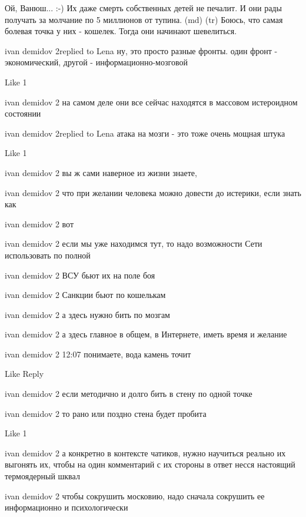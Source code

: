  
 
 
 
 

Ой, Ванюш... :-) Их даже смерть собственных детей не печалит. И они рады получать за молчание по 5 миллионов от тупина. (md) (tr) Боюсь, что самая болевая точка у них - кошелек. Тогда они начинают шевелиться.

ivan demidov 2replied to Lena
ну, это просто разные фронты. один фронт - экономический, другой - информационно-мозговой

    Like 1

ivan demidov 2
на самом деле они все сейчас находятся в массовом истероидном состоянии

ivan demidov 2replied to Lena
атака на мозги - это тоже очень мощная штука

    Like 1

ivan demidov 2
вы ж сами наверное из жизни знаете,

ivan demidov 2
что при желании человека можно довести до истерики, если знать как

ivan demidov 2
вот

ivan demidov 2
если мы уже находимся тут, то надо возможности Сети использовать по полной

ivan demidov 2
ВСУ бьют их на поле боя

ivan demidov 2
Санкции бьют по кошелькам

ivan demidov 2
а здесь нужно бить по мозгам

ivan demidov 2
а здесь главное в общем, в Интернете, иметь время и желание

ivan demidov 2
12:07
понимаете, вода камень точит

    Like
    Reply

ivan demidov 2
если методично и долго бить в стену по одной точке

ivan demidov 2
то рано или поздно стена будет пробита

    Like 1

ivan demidov 2
а конкретно в контексте чатиков, нужно научиться реально их выгонять их, чтобы на один комментарий с их стороны в ответ несся настоящий термоядерный шквал

ivan demidov 2
чтобы сокрушить московию, надо сначала сокрушить ее информационно и психологически

